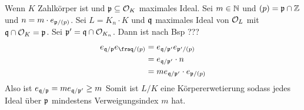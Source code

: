 \begin{Bsp}
	Wenn \(K\) Zahlkörper ist und \(\mathfrak{p}\subseteq\mathcal{O}_K\) maximales Ideal. Sei \(m\in\mathbb{N}\) und \((p)=\mathfrak{p}\cap \mathbb{Z}\) und \(n=m\cdot e_{\mathfrak{p}/(p)}\).
	Sei \(L=K_n\cdot K\) und \(\mathfrak{q}\) maximales Ideal von \(\mathcal{O}_L\) mit  \(\mathfrak{q}\cap \mathcal{O}_K=\mathfrak{p}\).
	Sei \(\mathfrak{p}'=\mathfrak{q}\cap \mathcal{O}_{K_n}\).
	Dann ist nach Bsp ???
	\begin{align*}
		e_{\frakq/\frakp}e_{\fraq/(p)}&=e_{\frakq/\frakp'}e_{\frakp'/(p)}\\
		&= e_{\frakq/\frakp'}\cdot n\\
		&= m e_{\frakq/\frakp'}\cdot e_{\frakp/(p)}
	\end{align*}
	Also ist \(e_{\mathfrak{q}/\mathfrak{p}}=m e_{\mathfrak{q}/\mathfrak{p}'}\geq m\)
	Somit ist \(L/K\) eine Körpererwetierung sodass jedes Ideal über \(\mathfrak{p}\) mindestens Verweigungsindex \(m\) hat.
\end{Bsp}





